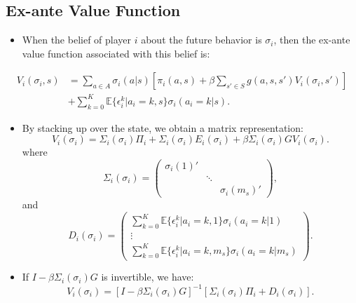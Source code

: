 \documentclass[
]{book}
\providecommand{\tightlist}{%
  \setlength{\itemsep}{0pt}\setlength{\parskip}{0pt}}
\begin{document}
\hypertarget{ex-ante-value-function}{%
\subsection{Ex-ante Value Function}\label{ex-ante-value-function}}

\begin{itemize}
\tightlist
\item
  When the belief of player \(i\) about the future behavior is
  \(\sigma_i\), then the ex-ante value function associated with this
  belief is:
\end{itemize}

\begin{equation}
\begin{split}
V_i(\sigma_i, s) &= \sum_{a \in A} \sigma_i(a|s)[\pi_i(a, s) + \beta \sum_{s' \in S} g(a, s, s') V_i(\sigma_i, s')]\\
& + \sum_{k = 0}^K \mathbb{E}\{\epsilon_i^k|a_i = k, s\}\sigma_i(a_i = k|s).
\end{split}
\end{equation}

\begin{itemize}
\tightlist
\item
  By stacking up over the state, we obtain a matrix representation:
  \begin{equation}
  V_i(\sigma_i) = \Sigma_i(\sigma_i) \Pi_i + \Sigma_i(\sigma_i) E_i(\sigma_i) + \beta \Sigma_i(\sigma_i) G V_i(\sigma_i).
  \end{equation} where \begin{equation}
  \Sigma_i(\sigma_i) = 
  \begin{pmatrix}
  \sigma_i(1)' & & \\
  & \ddots & \\
  & & \sigma_i(m_s)'
  \end{pmatrix},
  \end{equation} and \begin{equation}
  D_i(\sigma_i) =
  \begin{pmatrix}
  \sum_{k = 0}^K \mathbb{E}\{\epsilon_i^k|a_i = k, 1\}\sigma_i(a_i = k|1)\\
  \vdots\\
  \sum_{k = 0}^K \mathbb{E}\{\epsilon_i^k|a_i = k, m_s\}\sigma_i(a_i = k|m_s)
  \end{pmatrix}.
  \end{equation}
\item
  If \(I - \beta \Sigma_i(\sigma_i)G\) is invertible, we have: \[
  V_i(\sigma_i) = [I - \beta \Sigma_i(\sigma_i)G]^{-1}[\Sigma_i(\sigma_i)\Pi_i + D_i(\sigma_i)].
  \]
\end{itemize}
\end{document}
